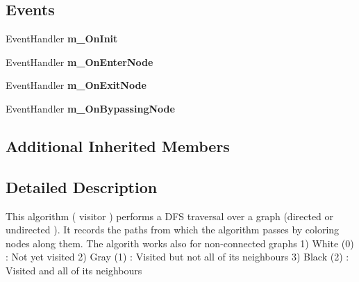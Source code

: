 \subsection*{Events}
\begin{DoxyCompactItemize}
\item 
\hypertarget{class_graph_library_1_1_aglorithms_1_1_g_alg___node_oriented_d_f_s_a0075221ca2acf0374839e43f771e5c17}{}Event\+Handler {\bfseries m\+\_\+\+On\+Init}\label{class_graph_library_1_1_aglorithms_1_1_g_alg___node_oriented_d_f_s_a0075221ca2acf0374839e43f771e5c17}

\item 
\hypertarget{class_graph_library_1_1_aglorithms_1_1_g_alg___node_oriented_d_f_s_ab9102270aa7568fd3bf5abbde240385e}{}Event\+Handler {\bfseries m\+\_\+\+On\+Enter\+Node}\label{class_graph_library_1_1_aglorithms_1_1_g_alg___node_oriented_d_f_s_ab9102270aa7568fd3bf5abbde240385e}

\item 
\hypertarget{class_graph_library_1_1_aglorithms_1_1_g_alg___node_oriented_d_f_s_a7a2e9dd262f27b2cfa97092224de4025}{}Event\+Handler {\bfseries m\+\_\+\+On\+Exit\+Node}\label{class_graph_library_1_1_aglorithms_1_1_g_alg___node_oriented_d_f_s_a7a2e9dd262f27b2cfa97092224de4025}

\item 
\hypertarget{class_graph_library_1_1_aglorithms_1_1_g_alg___node_oriented_d_f_s_a782cb35a1823fa98dcbaaaaae376e214}{}Event\+Handler {\bfseries m\+\_\+\+On\+Bypassing\+Node}\label{class_graph_library_1_1_aglorithms_1_1_g_alg___node_oriented_d_f_s_a782cb35a1823fa98dcbaaaaae376e214}

\end{DoxyCompactItemize}
\subsection*{Additional Inherited Members}


\subsection{Detailed Description}
This algorithm ( visitor ) performs a D\+F\+S traversal over a graph (directed or undirected ). It records the paths from which the algorithm passes by coloring nodes along them. The algorith works also for non-\/connected graphs 1) White (0) \+: Not yet visited 2) Gray (1) \+: Visited but not all of its neighbours 3) Black (2) \+: Visited and all of its neighbours 



